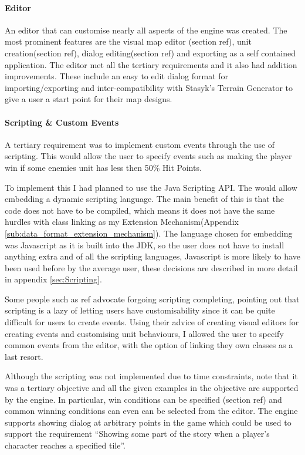 \paragraph{Editor\\}
An editor that can customise nearly all aspects of the engine was created.  The most prominent features are the visual map editor (section ref), unit creation(section ref), dialog editing(section ref) and exporting as a self contained application.  The editor met all the  tertiary requirements and it also had addition improvements. These include an easy to edit dialog format for importing/exporting and inter-compatibility  with Stasyk’s Terrain Generator to give a user a start point for their map designs.


\paragraph{Scripting \& Custom Events\\}
A tertiary requirement was to implement custom events through the use of scripting.  This would allow the user to specify events such as making the player win if some enemies unit has less then 50\% Hit Points. 

To implement this I had planned to use the Java Scripting API\cite{javas}. The would allow embedding a dynamic scripting language.  The main benefit of this is that the code does not have to be compiled, which means it does not have the same hurdles with class linking as my Extension Mechanism(Appendix \ref{sub:data_format_extension_mechanism}).   The language chosen for embedding was Javascript  as it is built into the JDK, so the user does not have to install anything extra and of all the scripting languages, Javascript  is more likely to have been used before by the average user, these decisions are described in more detail in appendix \ref{sec:Scripting}. 

Some people such as ref  advocate forgoing scripting completing, pointing out that scripting is a lazy of letting users have customisability since it can be quite difficult for users to create events.  Using their advice of creating visual editors for creating events and customising unit behaviours, I allowed the user to specify common events from the editor, with the option of linking they own classes as a last resort. 

Although the scripting was not implemented due to time constraints, note that it was a tertiary objective and all the given examples in the objective are supported by the engine. In particular, win conditions can be specified (section ref) and common winning conditions can even can be selected from the editor.  The engine supports showing dialog at arbitrary points in the game which could be used to support the requirement ``Showing some part of the story when a player’s character reaches a specified tile''.

